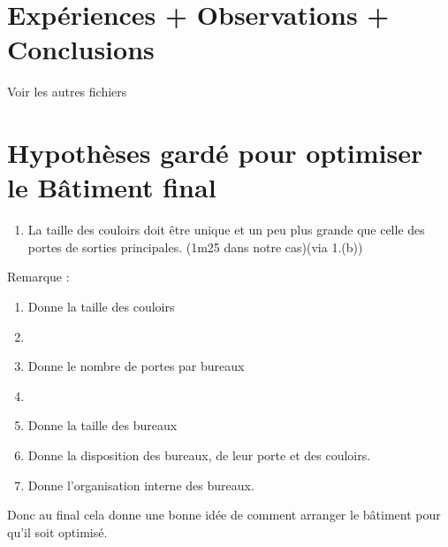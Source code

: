 \documentclass[12pt]{article}
\begin{document}
\section{Expériences + Observations + Conclusions}

Voir les autres fichiers

\section{Hypothèses gardé pour optimiser le Bâtiment final}

\begin{enumerate}
    \item La taille des couloirs doit être unique et un peu plus grande que celle des portes de sorties principales. (1m25 dans notre cas)(via 1.(b))
\newline\newline\end{enumerate}

Remarque :
\begin{enumerate}
    \item Donne la taille des couloirs
    \item 
    \item Donne le nombre de portes par bureaux
    \item 
    \item Donne la taille des bureaux
    \item Donne la disposition des bureaux, de leur porte et des couloirs.
    \item Donne l'organisation interne des bureaux.
\end{enumerate}

Donc au final cela donne une bonne idée de comment arranger le bâtiment pour qu'il soit optimisé.
\end{document}

